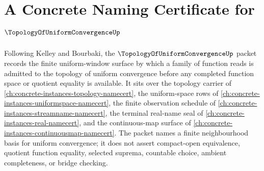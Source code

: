 \chapter{A Concrete Naming Certificate for $\TopologyOfUniformConvergenceUp$}
\label{ch:concrete-instances-topology-of-uniform-convergence-namecert}

Following Kelley and Bourbaki, the $\TopologyOfUniformConvergenceUp$ packet records the finite uniform-window surface by which a family of function reads is admitted to the topology of uniform convergence before any completed function space or quotient equality is available. It sits over the topology carrier of \autoref{ch:concrete-instances-topology-namecert}, the uniform-space rows of \autoref{ch:concrete-instances-uniformspace-namecert}, the finite observation schedule of \autoref{ch:concrete-instances-streamname-namecert}, the terminal real-name seal of \autoref{ch:concrete-instances-real-namecert}, and the continuous-map surface of \autoref{ch:concrete-instances-continuousmap-namecert}. The packet names a finite neighbourhood basis for uniform convergence; it does not assert compact-open equivalence, quotient function equality, selected suprema, countable choice, ambient completeness, or bridge checking.

